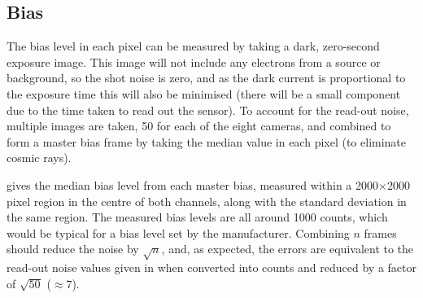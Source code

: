 
\subsection{Bias}
\label{sec:bias}
\begin{colsection}

The bias level in each pixel can be measured by taking a dark, zero-second exposure image. This image will not include any electrons from a source or background, so the shot noise is zero, and as the dark current is proportional to the exposure time this will also be minimised (there will be a small component due to the time taken to read out the sensor). To account for the read-out noise, multiple images are taken, 50 for each of the eight cameras, and combined to form a master bias frame by taking the median value in each pixel (to eliminate cosmic rays).

 gives the median bias level from each master bias, measured within a 2000$\times$2000 pixel region in the centre of both channels, along with the standard deviation in the same region. The measured bias levels are all around 1000 counts, which would be typical for a bias level set by the manufacturer. Combining $n$ frames should reduce the noise by $\sqrt{n}$, and, as expected, the errors are equivalent to the read-out noise values given in  when converted into counts and reduced by a factor of $\sqrt{50}$ ($\approx 7$).


\end{colsection}
